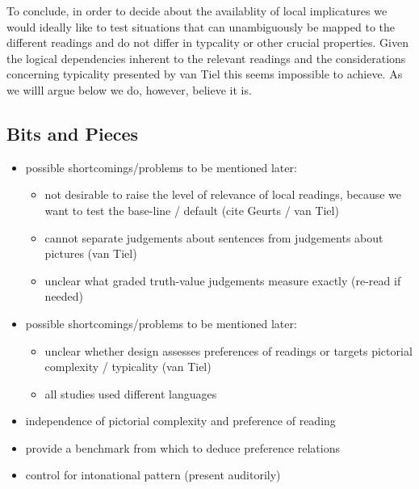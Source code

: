 \documentclass[fleqn,reqno,10pt,draft]{article}
\begin{document}
To conclude, in order to decide about the availablity of local
implicatures we would ideally like to test situations that can
unambiguously be mapped to the different readings and do not differ in
typcality or other crucial properties. Given the logical dependencies
inherent to the relevant readings and the considerations concerning
typicality presented by van Tiel this seems impossible to achieve. As
we willl argue below we do, however, believe it is.

\newpage

\subsection{Bits and Pieces}
\label{sec:whats-missing}


\bigskip

\begin{itemize}
\item possible shortcomings/problems to be mentioned later:
  \begin{itemize}
  \item not desirable to raise the level of relevance of local
    readings, because we want to test the base-line / default (cite
    Geurts / van Tiel)
  \item cannot separate judgements about sentences from judgements
    about pictures (van Tiel)
  \item unclear what graded truth-value judgements measure exactly
    (re-read \citet{Chemla2009:Presuppositions} if needed)
  \end{itemize}
\end{itemize}

\begin{itemize}
\item possible shortcomings/problems to be mentioned later:
  \begin{itemize}
  \item unclear whether design assesses preferences of readings or
    targets pictorial complexity / typicality (van Tiel)
  \item all studies used different languages
  \end{itemize}
\end{itemize}

\begin{itemize}
\item independence of pictorial complexity and preference of reading
\item provide a benchmark from which to deduce preference relations
\item control for intonational pattern (present auditorily)
\end{itemize}
\end{document}
